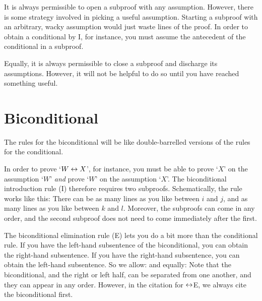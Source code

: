 It is always permissible to open a subproof with any assumption. However, there is some strategy involved in picking a useful assumption. Starting a subproof with an arbitrary, wacky assumption would just waste lines of the proof. In order to obtain a conditional by {\eif}I, for instance, you must assume the antecedent of the conditional in a subproof. 

Equally, it is always permissible to close a subproof and discharge its assumptions. However, it will not be helpful to do so until you have reached something useful.


\section{Biconditional}
The rules for the biconditional will be like double-barrelled versions of the rules for the conditional.

In order to prove `$W \leftrightarrow X$', for instance, you must be able to prove `$X$' on the assumption `$W$' \emph{and} prove `$W$' on the assumption `$X$'. The biconditional introduction rule ({\eiff}I) therefore requires two subproofs. Schematically, the rule works like this:
There can be as many lines as you like between $i$ and $j$, and as many lines as you like between $k$ and $l$. Moreover, the subproofs can come in any order, and the second subproof does not need to come immediately after the first.

The biconditional elimination rule ({\eiff}E) lets you do a bit more than the conditional rule. If you have the left-hand subsentence of the biconditional, you can obtain the right-hand subsentence. If you have the right-hand subsentence, you can obtain the left-hand subsentence. So we allow:
and equally:
Note that the biconditional, and the right or left half, can be separated from one another, and they can appear in any order. However, in the citation for $\leftrightarrow$E, we always cite the biconditional first.

